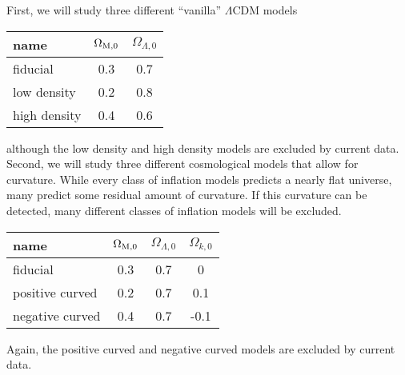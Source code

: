 \documentclass[modern]{aastex62}
\begin{document}
First, we will study three different ``vanilla'' $\Lambda$CDM models
\begin{center}
\begin{tabular}{lcc}
name & $\Omega_{{\rm M}, 0}$ & $\Omega_{\Lambda, 0}$ \\ \hline
fiducial & 0.3 & 0.7 \\
low density & 0.2 & 0.8 \\
high density & 0.4 & 0.6 \\
\end{tabular}
\end{center}
although the low density and high density models are excluded by current data.
Second, we will study three different cosmological models that allow for
curvature. While every class of inflation models predicts a nearly flat
universe, many predict some residual amount of curvature. If this curvature
can be detected, many different classes of inflation models will be excluded.
\begin{center}
\begin{tabular}{lccc}
name & $\Omega_{{\rm M}, 0}$ & $\Omega_{\Lambda, 0}$ & $\Omega_{k, 0}$ \\ \hline
fiducial & 0.3 & 0.7 & 0 \\
positive curved & 0.2 & 0.7 & 0.1 \\
negative curved & 0.4 & 0.7 & -0.1 \\
\end{tabular}
\end{center}
Again, the positive curved and negative curved models are excluded by current data.
\end{document}
